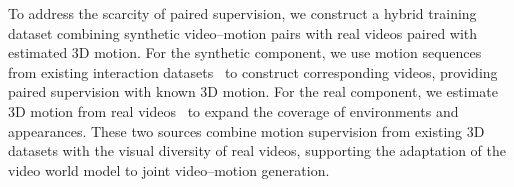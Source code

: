 To address the scarcity of paired supervision, we construct a hybrid training dataset combining synthetic video--motion pairs with real videos paired with estimated 3D motion. For the synthetic component, we use motion sequences from existing interaction datasets~\citep{li2023omomo,hassan2021samp,jiang2023chairs} to construct corresponding videos, providing paired supervision with known 3D motion. For the real component, we estimate 3D motion from real videos~\citep{patel2025camerahmr} to expand the coverage of environments and appearances. These two sources combine motion supervision from existing 3D datasets with the visual diversity of real videos, supporting the adaptation of the video world model to joint video--motion generation.

